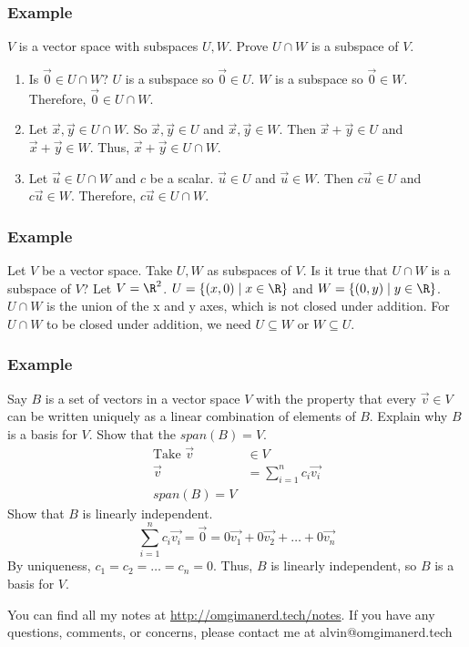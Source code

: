 \documentclass{math}
\begin{document}
\subsubsection*{Example}
\( V \) is a vector space with subspaces \( U,W \). Prove \( U\cap W \) is a
subspace of \( V \).
\begin{enumerate}
  \item Is \( \vec{0}\in U\cap W \)? \( U \) is a subspace so
  \( \vec{0}\in U \). \( W \) is a subspace so \( \vec{0}\in W \). Therefore,
  \( \vec{0}\in U\cap W \).
  \item Let \( \vec{x},\vec{y}\in U\cap W \). So \( \vec{x},\vec{y}\in U \)
  and \( \vec{x},\vec{y}\in W \). Then \( \vec{x}+\vec{y}\in U \) and
  \( \vec{x}+\vec{y}\in W \). Thus, \( \vec{x}+\vec{y}\in U\cap W \).
  \item Let \( \vec{u}\in U\cap W \) and \( c \) be a scalar. \( \vec{u}\in U \)
  and \( \vec{u}\in W \). Then \( c\vec{u}\in U \) and \( c\vec{u}\in W \).
  Therefore, \( c\vec{u}\in U\cap W \).
\end{enumerate}

\subsubsection*{Example}
Let \( V \) be a vector space. Take \( U,W \) as subspaces of \( V \). Is it
true that \( U\cap W \) is a subspace of \( V \)? Let \( V = \R^2 \).
\( U = \{(x,0)\mid x\in\R\} \) and \( W = \{(0,y)\mid y\in\R\} \). \( U\cap W \)
is the union of the x and y axes, which is not closed under addition. For
\( U\cap W \) to be closed under addition, we need \( U\subseteq W \) or
\( W\subseteq U \).

\subsubsection*{Example}
Say \( B \) is a set of vectors in a vector space \( V \) with the property that
every \( \vec{v}\in V \) can be written uniquely as a linear combination of
elements of \( B \). Explain why \( B \) is a basis for \( V \). Show that the
\( span(B) = V \).
\begin{align*}
  \text{Take }\vec{v} &\in V \\
  \vec{v} &= \sum_{i=1}^{n}c_i\vec{v_i} \\
  span(B) = V
\end{align*}
Show that \( B \) is linearly independent.
\[ \sum_{i=1}^{n}c_i\vec{v_i} = \vec{0} = 0\vec{v_1}+0\vec{v_2}+\dots+
  0\vec{v_n} \]
By uniqueness, \( c_1 = c_2 = \dots = c_n = 0 \). Thus, \( B \) is linearly
independent, so \( B \) is a basis for \( V \).

\begin{center}
  You can find all my notes at \url{http://omgimanerd.tech/notes}. If you have
  any questions, comments, or concerns, please contact me at
  alvin@omgimanerd.tech
\end{center}
\end{document}
